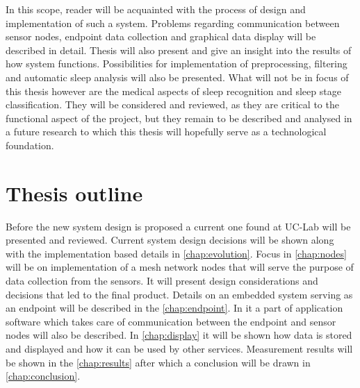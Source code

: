 In this scope, reader will be acquainted with the process of design and implementation of such a system. Problems regarding communication between sensor nodes, endpoint data collection and graphical data display will be described in detail. Thesis will also present and give an insight into the results of how system functions. Possibilities for implementation of preprocessing, filtering and automatic sleep analysis will also be presented. What will not be in focus of this thesis however are the medical aspects of sleep recognition and sleep stage classification. They will be considered and reviewed, as they are critical to the functional aspect of the project, but they remain to be described and analysed in a future research to which this thesis will hopefully serve as a technological foundation.


\section{Thesis outline}

Before the new system design is proposed a current one found at \ac{UC-Lab} will be presented and reviewed. Current system design decisions will be shown along with the implementation based details in \autoref{chap:evolution}. Focus in \autoref{chap:nodes} will be on implementation of a mesh network nodes that will serve the purpose of data collection from the sensors. It will present design considerations and decisions that led to the final product. Details on an embedded system serving as an endpoint will be described in the \autoref{chap:endpoint}. In it a part of application software which takes care of communication between the endpoint and sensor nodes will also be described. In \autoref{chap:display} it will be shown how data is stored and displayed and how it can be used by other services. Measurement results will be shown in the \autoref{chap:results} after which a conclusion will be drawn in \autoref{chap:conclusion}.